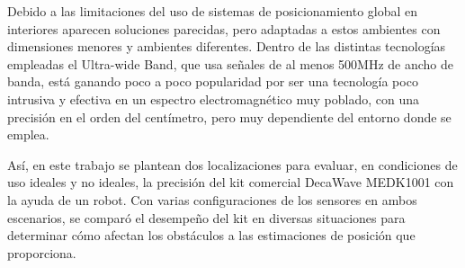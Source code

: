 Debido a las limitaciones del uso de sistemas de posicionamiento global en interiores aparecen soluciones parecidas, pero adaptadas a estos ambientes con dimensiones menores y ambientes diferentes.
Dentro de las distintas tecnologías empleadas el Ultra-wide Band, que usa señales de al menos 500MHz de ancho de banda, está ganando poco a poco popularidad por ser una tecnología poco intrusiva y efectiva en un espectro electromagnético muy poblado, con una precisión en el orden del centímetro, pero muy dependiente del entorno donde se emplea.

Así, en este trabajo se plantean dos localizaciones para evaluar, en condiciones de uso ideales y no ideales, la precisión del kit comercial DecaWave MEDK1001 con la ayuda de un robot.
Con varias configuraciones de los sensores en ambos escenarios, se comparó el desempeño del kit en diversas situaciones para determinar cómo afectan los obstáculos a las estimaciones de posición que proporciona.